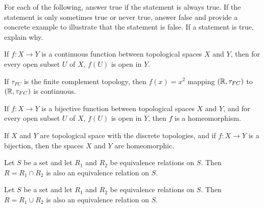 \begin{comment}
	\item Assume that $X$ is $T_4$. Then $X$ is also $T_1$, and we have already shown that $Y$ must be $T_1$. To show that $Y$ is $T_4$, we need to demonstrate that $Y$ is normal. Let $H$ and $K$ be disjoint closed sets in $Y$. Let  $C = f^{-1}(H)$ and $D = f^{-1}(K)$. Since $f$ is continuous, we know that $C$ and $D$ closed sets in $X$. Since $X$ is normal there exist disjoint open sets $O$ and $P$ in $X$ such that $C \subseteq O$ and $D \subseteq P$. Let $U = f(O)$ and $V = f(P)$. Then $U$ and $V$ are open in $Y$. The fact that $f$ is a bijection means that $f(C) = H$ and $f(D) = K$. It follows that $H = f(C) \subseteq f(O) = U$ and $K = f(D) \subseteq f(P) = V$. That $U$ and $V$ are disjoint is the same argument as in the previous case. We conclude that $Y$ is also $T_4$. 	
	
	\end{itemize}

\end{comment}

\item For each of the following, answer true if the statement is always true. If the statement is only sometimes true or never true, answer false and provide a concrete example to illustrate that the statement is false. If a statement is true, explain why. 
	\ba
	\item If $f : X \to Y$ is a continuous function between topological spaces $X$ and $Y$, then for every open subset $U$ of $X$, $f(U)$ is open in $Y$.
	
	\item If $\tau_{FC}$ is the finite complement topology, then $f(x) = x^2$ mapping $(\mathbb{R}, \tau_{FC})$ to $(\mathbb{R}, \tau_{FC})$ is continuous.

	\item If $f : X \to Y$ is a bijective function between topological spaces $X$ and $Y$, and for every open subset $U$ of $X$, $f(U)$ is open in $Y$, then $f$ is a homeomorphism. 

	\item If $X$ and $Y$ are topological space with the discrete topologies, and if $f: X \to Y$ is a bijection, then the spaces $X$ and $Y$ are homeomorphic.

\item Let $S$ be a set and let $R_1$ and $R_2$ be equivalence relations on $S$. Then $R = R_1 \cap R_2$ is also an equivalence relation on $S$.
	
	\item Let $S$ be a set and let $R_1$ and $R_2$ be equivalence relations on $S$. Then $R = R_1 \cup R_2$ is also an equivalence relation on $S$.
		
